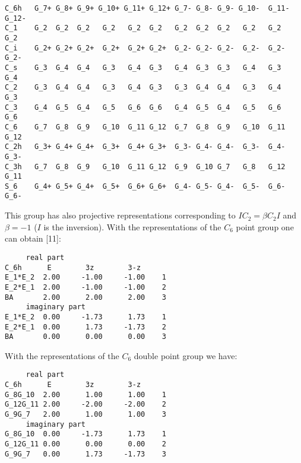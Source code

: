 \documentclass[12pt,a4paper,twoside]{report}
\begin{document}
\begin{tcolorbox}
\begin{footnotesize}
\begin{verbatim}
C_6h   G_7+ G_8+ G_9+ G_10+ G_11+ G_12+ G_7- G_8- G_9- G_10-  G_11- G_12-
C_1    G_2  G_2  G_2   G_2   G_2  G_2   G_2  G_2  G_2   G_2   G_2   G_2
C_i    G_2+ G_2+ G_2+  G_2+  G_2+ G_2+  G_2- G_2- G_2-  G_2-  G_2-  G_2-  
C_s    G_3  G_4  G_4   G_3   G_4  G_3   G_4  G_3  G_3   G_4   G_3   G_4
C_2    G_3  G_4  G_4   G_3   G_4  G_3   G_3  G_4  G_4   G_3   G_4   G_3    
C_3    G_4  G_5  G_4   G_5   G_6  G_6   G_4  G_5  G_4   G_5   G_6   G_6  
C_6    G_7  G_8  G_9   G_10  G_11 G_12  G_7  G_8  G_9   G_10  G_11  G_12 
C_2h   G_3+ G_4+ G_4+  G_3+  G_4+ G_3+  G_3- G_4- G_4-  G_3-  G_4-  G_3-   
C_3h   G_7  G_8  G_9   G_10  G_11 G_12  G_9  G_10 G_7   G_8   G_12  G_11 
S_6    G_4+ G_5+ G_4+  G_5+  G_6+ G_6+  G_4- G_5- G_4-  G_5-  G_6-  G_6-
\end{verbatim}
\end{footnotesize}
\end{tcolorbox}

This group has also projective representations corresponding to
$IC_2 = \beta C_2 I$ and $\beta=-1$ ($I$ is the inversion).
With the representations of the $C_6$ point group one can obtain [11]:

\begin{tcolorbox}
\begin{footnotesize}
\begin{verbatim}
     real part
C_6h      E        3z        3-z
E_1*E_2  2.00     -1.00     -1.00    1
E_2*E_1  2.00     -1.00     -1.00    2
BA       2.00      2.00      2.00    3
     imaginary part
E_1*E_2  0.00     -1.73      1.73    1
E_2*E_1  0.00      1.73     -1.73    2
BA       0.00      0.00      0.00    3
\end{verbatim}
\end{footnotesize}
\end{tcolorbox}

With the representations of the $C_6$ double point group we have:
\begin{tcolorbox}
\begin{footnotesize}
\begin{verbatim}
     real part
C_6h      E        3z        3-z
G_8G_10  2.00      1.00      1.00    1
G_12G_11 2.00     -2.00     -2.00    2
G_9G_7   2.00      1.00      1.00    3
     imaginary part
G_8G_10  0.00     -1.73      1.73    1
G_12G_11 0.00      0.00      0.00    2
G_9G_7   0.00      1.73     -1.73    3
\end{verbatim}
\end{footnotesize}
\end{tcolorbox}
\end{document}
